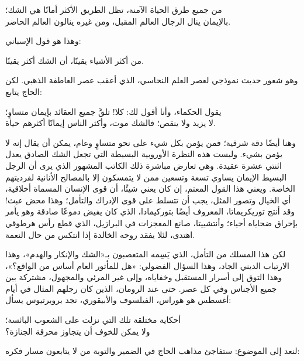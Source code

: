 \begin{SourceQuotation}
من جميع طرق الحياة الآمنة، تظل الطريق الأكثر أمانًا هي الشك؛\\
بالإيمان ينال الرجال العالم المقبل، ومن غيره ينالون العالم الحاضر.
\end{SourceQuotation}

وهذا هو قول الإسباني:

\begin{SourceQuotation}
من أكثر الأشياء يقينًا، أن الشك أكثر يقينًا.
\end{SourceQuotation}

وهو شعور حديث نموذجي لعصر العلم النحاسي، الذي أعقب عصر العاطفة الذهبي. لكن الحاج يتابع:

\begin{SourceQuotation}
يقول الحكماء، وأنا أقول لك: كلا! تلقَّ جميع العقائد بإيمان متساوٍ؛\\
لا يزيد ولا ينقص؛ فالشك موت، وأكثر الناس إيمانًا أكثرهم حياة.
\end{SourceQuotation}

وهنا أيضًا دقة شرقية؛ فمن يؤمن بكل شيء على نحو متساوٍ وعام، يمكن أن يقال إنه لا يؤمن بشيء. وليست هذه النظرة الأوروبية البسيطة التي تجعل الشك الصادق يعدل اثنتي عشرة عقيدة. وهي تعارض مباشرة ذلك الكاتب المشهور الذي يرى أن الرجل البسيط الإيمان يساوي تسعة وتسعين ممن لا يتمسكون إلا بالمصالح الأنانية لفرديتهم الخاصة. ويعني هذا القول المعتم، إن كان يعني شيئًا، أن قوى الإنسان المسماة أخلاقية، أي الخيال وتصور المثل، يجب أن تتسلط على قوى الإدراك والتأمل؛ وهذا محض عبث! وقد أنتج توريكريماتا، المعروف أيضًا بتوركيمادا، الذي كان يفيض دموعًا صادقة وهو يأمر بإحراق ضحاياه أحياء؛ وأنتشييتا، صانع المعجزات في البرازيل، الذي قطع رأس هرطوقي اهتدى، لئلا يفقد روحه الخالدة إذا انتكس من حال النعمة.

لكن هذا المسلك من التأمل، الذي يَسِمه المتعصبون بـ«الشك والإنكار والهدم»، وهذا الارتياب الديني الجاد، وهذا السؤال الفضولي: «هل للمأثور العام أساس من الواقع؟»، وهذا التوق إلى أسرار المستقبل وخفاياه، وإلى غير المرئي والمجهول، مشتركة بين جميع الأجناس وفي كل عصر. حتى عند الرومان، الذين كان رجلهم المثال في أيام أغسطس هو هوراس، الفيلسوف والأبيقوري، نجد بروبرتيوس يسأل:

\begin{SourceQuotation}
أحكاية مختلقة تلك التي نزلت على الشعوب البائسة؛\\
ولا يمكن للخوف أن يتجاوز محرقة الجنازة؟
\end{SourceQuotation}

لنعد إلى الموضوع: ستفاجئ مذاهب الحاج في الضمير والتوبة من لا يتابعون مسار فكره:

